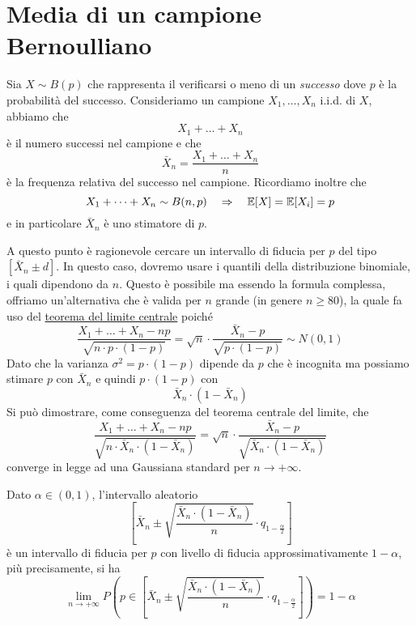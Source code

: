 \section{Media di un campione Bernoulliano}
Sia $X \sim B(p)$ che rappresenta il verificarsi o meno di un \emph{successo} dove $p$ è la
probabilità del successo. Consideriamo un campione $X_1, \dots, X_n$ i.i.d. di $X$, abbiamo che
\[ X_1 + \dots + X_n \]
è il numero successi nel campione e che
\[ \bar{X}_n = \frac{X_1 + \dots + X_n}{n} \]
è la frequenza relativa del successo nel campione. Ricordiamo inoltre che
\[ X_1 + \dots + X_n \sim B(n,p) \quad \Rightarrow \quad \mathbb{E}[X] = \mathbb{E}[X_i] = p \]
e in particolare $\bar{X}_n$ è uno stimatore di $p$.

A questo punto è ragionevole cercare un intervallo di fiducia per $p$ del tipo
$[\bar{X}_n \pm d]$. In questo caso, dovremo usare i quantili della distribuzione binomiale,
i quali dipendono da $n$. Questo è possibile ma essendo la formula complessa, offriamo
un'alternativa che è valida per $n$ grande (in genere $n \geq 80$), la quale fa uso del
\hyperref[th: tlc]{teorema del limite centrale} poiché
\[
	\frac{X_1 + \dots + X_n - np}{\sqrt{n \cdot p \cdot (1-p)}} =
	\sqrt{n} \cdot \frac{\bar{X}_n - p}{\sqrt{p \cdot (1-p)}} \sim N(0,1)
\]
Dato che la varianza $\sigma^2 = p \cdot (1-p)$ dipende da $p$ che è incognita ma possiamo stimare
$p$ con $\bar{X}_n$ e quindi $p \cdot (1-p)$ con
\[ \bar{X}_n \cdot (1 - \bar{X}_n) \]
Si può dimostrare, come conseguenza del teorema centrale del limite, che
\[
	\frac{X_1 + \dots + X_n - np}{\sqrt{n \cdot \bar{X}_n \cdot (1 - \bar{X}_n)}} =
	\sqrt{n} \cdot \frac{\bar{X}_n - p}{\sqrt{\bar{X}_n \cdot (1 - \bar{X}_n)}}
\]
converge in legge ad una Gaussiana standard per $n \to +\infty$.

\begin{proposition}
	Dato $\alpha \in (0,1)$, l'intervallo aleatorio
	\[
		\left[
			\bar{X}_n \pm \sqrt{\frac{\bar{X}_n \cdot (1 - \bar{X}_n)}{n}}
			\cdot q_{1 - \frac{\alpha}{2}}
			\right]
	\]
	è un intervallo di fiducia per $p$ con livello di fiducia approssimativamente $1-\alpha$, più
	precisamente, si ha
	\[
		\lim_{n \to +\infty} P \left( p \in \left[ \bar{X}_n \pm
			\sqrt{\frac{\bar{X}_n \cdot (1 - \bar{X}_n)}{n}} \cdot
			q_{1 - \frac{\alpha}{2}} \right] \right) = 1 - \alpha
	\]
\end{proposition}

